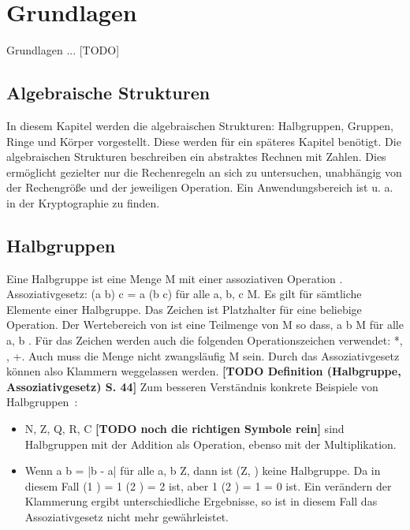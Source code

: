 \section{Grundlagen}
	Grundlagen ... [TODO]
	
	\subsection{Algebraische Strukturen}
		In diesem Kapitel werden die algebraischen Strukturen: Halbgruppen, Gruppen, Ringe und Körper vorgestellt. Diese werden für ein späteres Kapitel benötigt. Die algebraischen Strukturen beschreiben ein abstraktes Rechnen mit Zahlen. Dies ermöglicht gezielter nur die Rechenregeln an sich zu untersuchen, unabhängig von der Rechengröße und der jeweiligen Operation. Ein Anwendungsbereich ist u. a. in der Kryptographie zu finden.~\cite{Kryptographie:und:Algorithmen}
	
		\subsection{Halbgruppen}
			Eine Halbgruppe ist eine Menge M mit einer assoziativen Operation \mycircOhne. Assoziativgesetz: (a \mycirc b) \mycirc c = a \mycirc (b \mycirc c) für alle a, b, c \myin M. Es gilt für sämtliche Elemente einer Halbgruppe. Das Zeichen \mycirc ist Platzhalter für eine beliebige Operation. Der Wertebereich von \mycirc ist eine Teilmenge von M so dass, a \mycirc b \myin M für alle a, b \myin. Für das Zeichen \mycirc werden auch die folgenden Operationszeichen verwendet: *, \mycdot, +. Auch muss die Menge nicht zwangsläufig M sein. Durch das Assoziativgesetz können also Klammern weggelassen werden. \textbf{[TODO Definition (Halbgruppe, Assoziativgesetz) S. 44]} Zum besseren Verständnis konkrete Beispiele von Halbgruppen~\cite{Erste:Hilfe:in:Linearer:Algebra}:
			
			\begin{itemize}
				\item N, Z, Q, R, C \textbf{[TODO noch die richtigen Symbole rein]} sind Halbgruppen mit der Addition als Operation, ebenso mit der Multiplikation.
				\item Wenn a \mycirc b = |b - a| für alle a, b \myin Z, dann ist (Z, \mycirc) keine Halbgruppe. Da in diesem Fall (1 )  = 1 \mycirc (2 ) = 2 ist, aber 1 \mycirc (2 ) = 1  = 0 ist. Ein verändern der Klammerung ergibt unterschiedliche Ergebnisse, so ist in diesem Fall das Assoziativgesetz nicht mehr gewährleistet.
			\end{itemize}
		
